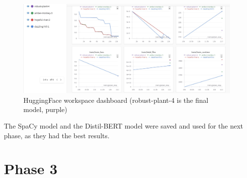 \documentclass[12pt]{article}
\begin{document}
\begin{figure}[h!]
    \centering
    \includegraphics[width=1\textwidth]{P2.Distil-BERT.jpg}
    \caption{HuggingFace workspace dashboard (robust-plant-4 is the final model, purple)}
    \label{fig:P2.SpaCy}
\end{figure}

The SpaCy model and the Distil-BERT model were saved and used for the next phase,
as they had the best results.

\section{Phase 3}



\makeendpage
\end{document}
